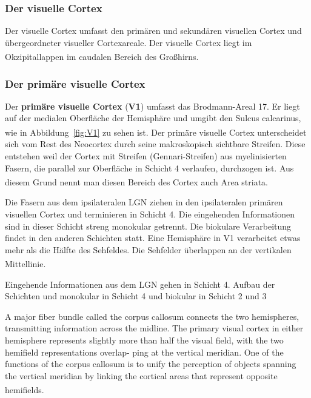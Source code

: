 \documentclass[12pt,a4paper,pdftex]{article}
\begin{document}
\subsubsection*{Der visuelle Cortex}

Der visuelle Cortex umfasst den primären und sekundären visuellen Cortex und übergeordneter visueller Cortexareale. Der visuelle Cortex liegt im Okzipitallappen im caudalen Bereich des Großhirns. \textsuperscript{\cite[15]{crossman2014neuroanatomy}} 


\subsubsection*{Der primäre visuelle Cortex}

Der \textbf{primäre visuelle Cortex} (\textbf{V1})  umfasst das Brodmann-Areal 17. Er liegt auf der medialen Oberfläche der Hemisphäre und umgibt den Sulcus calcarinus, wie in Abbildung~\ref{fig:V1} zu sehen ist. \textsuperscript{\cite[10]{neurowissenschaften_baer}} 
Der primäre visuelle Cortex unterscheidet sich vom Rest des Neocortex durch seine makroskopisch sichtbare Streifen. Diese entstehen weil der Cortex mit Streifen (Gennari-Streifen) aus myelinisierten Fasern, die parallel zur Oberfläche in Schicht 4 verlaufen, durchzogen ist. Aus diesem Grund nennt man diesen Bereich des Cortex auch Area striata. \textsuperscript{\cite[18]{smith2008biology}}

Die Fasern aus dem ipsilateralen LGN ziehen in den ipsilateralen primären visuellen Cortex und terminieren in Schicht 4. Die eingehenden Informationen sind in dieser Schicht streng monokular getrennt. Die biokulare Verarbeitung findet in den anderen Schichten statt. Eine Hemisphäre in V1 verarbeitet etwas mehr als die Hälfte des Sehfeldes. Die Sehfelder überlappen an der vertikalen Mittellinie. \textsuperscript{\cite[25]{kandel2013principles}} 


Eingehende Informationen aus dem LGN gehen in Schicht 4. 
Aufbau der Schichten und monokular in Schicht 4 und biokular in Schicht 2 und 3

A major fiber bundle called the corpus callosum
connects the two hemispheres, transmitting information
across the midline. The primary visual cortex in either
hemisphere represents slightly more than half the visual
field, with the two hemifield representations overlap-
ping at the vertical meridian. One of the functions of the
corpus callosum is to unify the perception of objects
spanning the vertical meridian by linking the cortical
areas that represent opposite hemifields.
\textsuperscript{\cite[25]{kandel2013principles}}
\end{document}
